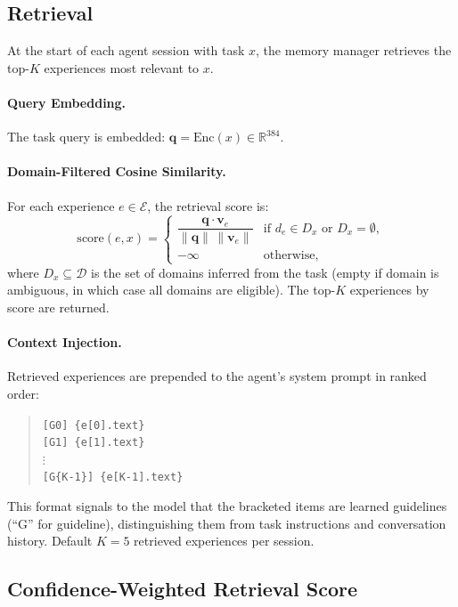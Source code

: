 \documentclass[11pt]{article}
\begin{document}
\subsection{Retrieval}
\label{sec:retrieval}

At the start of each agent session with task $x$, the memory manager retrieves
the top-$K$ experiences most relevant to $x$.

\paragraph{Query Embedding.}
The task query is embedded: $\bm{q} = \text{Enc}(x) \in \mathbb{R}^{384}$.

\paragraph{Domain-Filtered Cosine Similarity.}
For each experience $e \in \mathcal{E}$, the retrieval score is:
\begin{equation}
    \text{score}(e, x) =
    \begin{cases}
        \dfrac{\bm{q} \cdot \bm{v}_e}{\|\bm{q}\|\,\|\bm{v}_e\|} & \text{if } d_e \in D_x \text{ or } D_x = \emptyset, \\
        -\infty & \text{otherwise,}
    \end{cases}
    \label{eq:retrieval-score}
\end{equation}
where $D_x \subseteq \mathcal{D}$ is the set of domains inferred from the task
(empty if domain is ambiguous, in which case all domains are eligible). The
top-$K$ experiences by score are returned.

\paragraph{Context Injection.}
Retrieved experiences are prepended to the agent's system prompt in ranked order:
\begin{quote}
\texttt{[G0] \{e[0].text\}}\\
\texttt{[G1] \{e[1].text\}}\\
$\vdots$\\
\texttt{[G\{K-1\}] \{e[K-1].text\}}
\end{quote}
This format signals to the model that the bracketed items are learned
guidelines (``G'' for guideline), distinguishing them from task instructions
and conversation history. Default $K = 5$ retrieved experiences per session.

\subsection{Confidence-Weighted Retrieval Score}
\end{document}
